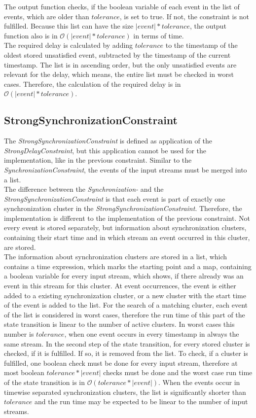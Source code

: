 	The output function checks, if the boolean variable of each event in the list of events, which are older than $tolerance$, is set to true. If not, the constraint is not fulfilled. Because this list can have the size $|event|*tolerance$, the output function also is in $\mathcal{O}(|event|*tolerance)$ in terms of time.\\
	The required delay is calculated by adding $tolerance$ to the timestamp of the oldest stored unsatisfied event, subtracted by the timestamp of the current timestamp. The list is in ascending order, but the only unsatisfied events are relevant for the delay, which means, the entire list must be checked in worst cases. Therefore, the calculation of the required delay is in $\mathcal{O}(|event|*tolerance)$.
	
\subsection{StrongSynchronizationConstraint}
	The \emph{StrongSynchronizationConstraint} is defined as application of the \emph{StrongDelayConstraint}, but this application cannot be used for the implementation, like in the previous constraint. Similar to the \emph{SynchronizationConstraint}, the events of the input streams must be merged into a list.\\
	The difference between the \emph{Synchronization-} and the \emph{StrongSynchronizationConstraint} is that each event is part of exactly one synchronization cluster in the \emph{StrongSynchronizationConstraint}. Therefore, the implementation is different to the implementation of the previous constraint. Not every event is stored separately, but information about synchronization clusters, containing their start time and in which stream an event occurred in this cluster, are stored.\\
	The information about synchronization clusters are stored in a list, which contains a time expression, which marks the starting point and a map, containing a boolean variable for every input stream, which shows, if there already was an event in this stream for this cluster. At event occurrences, the event is either added to a existing synchronization cluster, or a new cluster with the start time of the event is added to the list. For the search of a matching cluster, each event of the list is considered in worst cases, therefore the run time of this part of the state transition is linear to the number of active clusters. In worst cases this number is $tolerance$, when one event occurs in every timestamp in always the same stream. In the second step of the state transition, for every stored cluster is checked, if it is fulfilled. If so, it is removed from the list. To check, if a cluster is fulfilled, one boolean check must be done for every input stream, therefore at most boolean $tolerance*|event|$ checks must be done and the worst case run time of the state transition is in $\mathcal{O}(tolerance * |event|)$. When the events occur in timewise separated synchronization clusters, the list is significantly shorter than $tolerance$ and the run time may be expected to be linear to the number of input streams.\\
